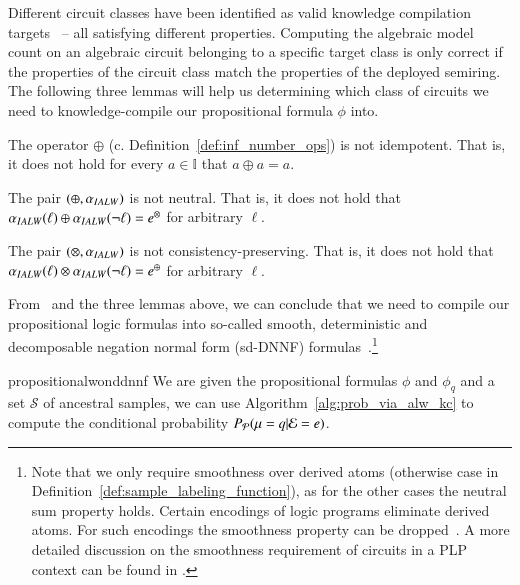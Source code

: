 Different circuit classes have been identified as valid knowledge compilation targets~\citep{darwiche2002knowledge} -- all satisfying different properties.
Computing the algebraic model count on an algebraic circuit belonging to a specific target class is only correct if the properties of the circuit class match the properties of the deployed semiring.
The following three lemmas will help us determining which class of circuits we need to knowledge-compile our propositional formula $\phi$ into.

\begin{lemma}
\label{lem:non_idem}
The operator $\oplus$ (c. Definition~\ref{def:inf_number_ops}) is not idempotent. That is, it does not hold for every $a \in \mathbb{I}$ that $a\oplus a =a$. 
\end{lemma}
\begin{lemma} The pair  $(\oplus, \alpha_{IALW})$ is not neutral. That is, it does not hold that $\alpha_{IALW}(\ell)\oplus \alpha_{IALW}(\neg \ell) = e^{\otimes}$ for arbitrary $\ell$.
\end{lemma}
\begin{lemma} 
\label{lem:non_cons}
The pair  $(\otimes, \alpha_{IALW})$ is not consistency-preserving. That is, it does not hold that $\alpha_{IALW}(\ell)\otimes \alpha_{IALW}(\neg \ell) = e^{\oplus}$ for arbitrary $\ell$.
\end{lemma}



From~\citep[Theorem 2 and Theorem 7]{kimmig2017algebraic} and the three lemmas above, we can conclude that we need to compile our propositional logic formulas into so-called smooth, deterministic and decomposable negation normal form (sd-DNNF) formulas~\citep{darwiche2001tractable}.\footnote{Note that we only require smoothness over derived atoms (otherwise case in Definition~\ref{def:sample_labeling_function}), as for the other cases the neutral sum property holds. Certain encodings of logic programs eliminate derived atoms. For such encodings the smoothness property can be dropped~\citep{vlasselaer2014compiling}. A more detailed discussion on the smoothness requirement of circuits in a PLP context can be found in \citep[Appendix C]{fierens2015inference}.}




\begin{restatable}{proposition}{alwonddnnf}
\label{prop:alwonddnnf}
    We are given the propositional formulas $\phi$ and $\phi_q$ and a set $\mathcal{S}$ of ancestral samples, we can use Algorithm~\ref{alg:prob_via_alw_kc} to compute the conditional probability $P_\mathcal{P}(\mu=q|\mathcal{E}=e)$.
\end{restatable}

